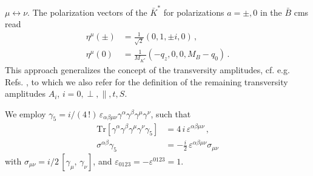  $\mu\leftrightarrow \nu$.
The polarization vectors of the $\bar{K}^*$ for polarizations $a = \pm,0$ in the $\bar B$ cms read
\begin{equation}
\label{eq:pol-vectors:eta}
\begin{aligned}
  \eta^\mu(\pm) & = \frac{1}{\sqrt{2}}(0,1,\pm i,0)\,,\\
  \eta^\mu(0)   & = \frac{1}{M_{K^*}}(-q_z, 0, 0, M_B-q_0) \, .
\end{aligned}
\end{equation}
This approach generalizes the concept of the transversity amplitudes,
cf. e.g. Refs.  \cite{Faessler:2002ut,Kruger:2005ep,Altmannshofer:2008dz}, to
which we also refer for the definition of the remaining transversity amplitudes
$A_{i}$, $i=0,\perp,\parallel,t,S$.

We employ $\gamma_5 = i/(4\,!)\, \varepsilon_{\alpha\beta\mu\nu} \gamma^\alpha
\gamma^\beta \gamma^\mu \gamma^\nu$, such that
\begin{equation}
\label{eq:gamma5rel}
\begin{aligned}
  \mbox{Tr}[\gamma^\alpha \gamma^\beta \gamma^\mu \gamma^\nu \gamma_5] & =
     4\, i\, \varepsilon^{\alpha\beta\mu\nu}\, ,\\
  \sigma^{\alpha\beta} \gamma_5 & = 
     -\frac{i}{2}\,\varepsilon^{\alpha\beta\mu\nu} \sigma_{\mu\nu}
\end{aligned}
\end{equation}
with $\sigma_{\mu\nu} = i/2\, [\gamma_\mu,\,
\gamma_\nu]$, and $\varepsilon_{0123} = -\varepsilon^{0123} = 1$.
